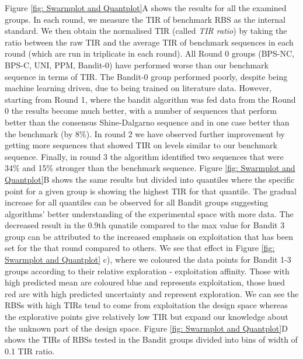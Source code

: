 \documentclass{article}
\begin{document}
Figure \ref{fig: Swarmplot and Quantplot}A shows the results for all the examined groups. 
In each round, we measure the TIR of benchmark RBS as the internal standard. 
We then obtain the normalised TIR (called \textit{TIR ratio}) by taking the ratio between the raw TIR and the average TIR of benchmark sequences in each round (which are run in triplicate in each round).
All Round 0 groups (BPS-NC, BPS-C, UNI, PPM, Bandit-0) have performed worse than our benchmark sequence in terms of TIR. 
The Bandit-0 group performed poorly, despite being machine learning driven, due to being trained on literature data.
However, starting from Round 1, where the bandit algorithm was fed data from the Round 0 the results become much better, with a number of sequences that perform better than the consensus Shine-Dalgarno sequence and in one case better than the benchmark (by 8\%).
In round 2 we have observed further improvement by getting more sequences that showed TIR on levels similar to our benchmark sequence.
Finally, in round 3 the algorithm identified two sequences that were 34\% and 15\% stronger than the benchmark sequence.
Figure \ref{fig: Swarmplot and Quantplot}B shows the same results but divided into quantiles where the specific point for a given group is showing the highest TIR for that quantile.
The gradual increase for all quantiles can be observed for all Bandit groups suggesting algorithms' better understanding of the experimental space with more data.
The decreased result in the 0.9th qunatile compared to the max value for Bandit 3 group can be attributed to the increased emphasis on exploitation that has been set for the that round compared to others.
We see that effect in Figure \ref{fig: Swarmplot and Quantplot} c), where we coloured the data points for Bandit 1-3 groups according to their relative exploration - exploitation affinity.
Those with high predicted mean are coloured blue and represents exploitation, those hued red are with high predicted uncertainty and represent exploration.
We can see the RBSs with high TIRs tend to come from exploitation the design space whereas the explorative points give relatively low TIR but expand our knowledge about the unknown part of the design space. 
Figure \ref{fig: Swarmplot and Quantplot}D shows the TIRs of RBSs tested in the Bandit groups divided into bins of width of 0.1 TIR ratio.
\end{document}
